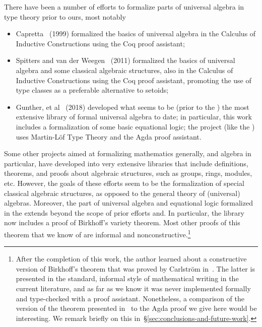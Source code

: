 \documentclass[a4paper,UKenglish,cleveref,autoref,thm-restate]{lipics-v2021}
\begin{document}
There have been a number of efforts to formalize parts of universal algebra in type theory prior to ours, most notably
\begin{itemize}
  \item Capretta~\cite{Capretta:1999} (1999) formalized the basics of universal algebra in the Calculus of Inductive Constructions using the Coq proof assistant;
    \item Spitters and van der Weegen~\cite{Spitters:2011} (2011) formalized the basics of universal algebra and some classical algebraic structures, also in the Calculus of Inductive Constructions using the Coq proof assistant, promoting the use of type classes as a preferable alternative to setoids;
 \item Gunther, et al~\cite{Gunther:2018} (2018) developed what seems to be (prior to the \ualib) the most extensive library of formal universal algebra to date; in particular, this work includes a formalization of some basic equational logic; the project (like the \ualib) uses Martin-L\"of Type Theory and the Agda proof assistant.
\end{itemize}
Some other projects aimed at formalizing mathematics generally, and algebra in particular, have developed into very extensive libraries that include definitions, theorems, and proofs about algebraic structures, such as groups, rings, modules, etc.  However, the goals of these efforts seem to be the formalization of special classical algebraic structures, as opposed to the general theory of (universal) algebras. Moreover, the part of universal algebra and equational logic formalized in the \ualib extends beyond the scope of prior efforts and. In particular, the library now includes a proof of Birkhoff's variety theorem.  Most other proofs of this theorem that we know of are informal and nonconstructive.\footnote{After the completion of this work, the author learned about a constructive version of Birkhoff's theorem that was proved by Carlstr\"om in~\cite{Carlstrom:2008}.  The latter is presented in the standard, informal style of mathematical writing in the current literature, and as far as we know it was never implemented formally and type-checked with a proof assistant. Nonetheless, a comparison of the version of the theorem presented in~\cite{Carlstrom:2008} to the Agda proof we give here would be interesting. We remark briefly on this in~\S\ref{sec:conclusions-and-future-work}.}
\end{document}
